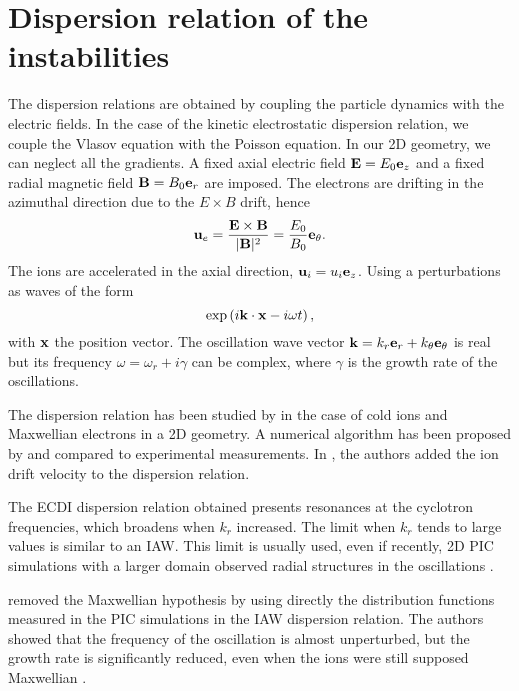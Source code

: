 
\section{Dispersion relation of the instabilities}
  \label{sec-DR-kinetic}
  
  
  The dispersion relations are obtained by coupling the particle dynamics with the electric fields.
  In the case of the kinetic electrostatic dispersion relation, we couple the Vlasov equation with the Poisson equation.
  In our \ac{2D} geometry, we can neglect all the gradients.
  A fixed axial electric field ${\mathbf E} = E_0 {\mathbf e_z}$ and a fixed radial magnetic field ${\mathbf B} = B_0 {\mathbf e_r}$ are imposed.
  The electrons are drifting in the azimuthal direction due to the $E\times B$ drift, hence
  \[ {\mathbf u_{e}} = \frac{{\mathbf E} \times {\mathbf B}}{\lvert{\mathbf B}\rvert^2} = \frac{E_0}{B_0}  {\mathbf e_{\theta}}.    \]
  The ions are accelerated in the axial direction, $ {\mathbf u_i} = u_i  {\mathbf e_z}$.
  Using a perturbations as waves of the form \[ \exp \left( i {\mathbf k} \cdot {\mathbf x} - i \omega t  \right), \]
  with ${\mathbf x}$ the position vector.
  The oscillation wave vector ${\mathbf k} = k_r {\mathbf e_r} + k_{\theta} {\mathbf e_{\theta}}$ is real but its frequency $\omega = \omega_r + i \gamma$ can be complex, where $\gamma$ is the growth rate of the oscillations. 
  
  \vspace{1em}
  The dispersion relation has been studied by \citet{ducrocq2006} in the case of cold ions and Maxwellian electrons in a \ac{2D} geometry.
  A numerical algorithm has been proposed by \citet{cavalier2013} and compared to experimental measurements.
  In \citet{lafleur2016}, the authors added the ion drift velocity to the dispersion relation.
  
  The \ac{ECDI} dispersion relation obtained presents resonances at the cyclotron frequencies, which broadens when $k_r$ increased.
  The limit when $k_r$ tends to large values is similar to an \ac{IAW}.
  This limit is usually used, even if recently, \ac{2D} \ac{PIC} simulations with a larger domain observed radial structures in the oscillations \citep{janhunen2018,hara2019a}.
  
  \citet{lafleur2018} removed the Maxwellian hypothesis by using directly the distribution functions measured in the \ac{PIC} simulations in the \ac{IAW} dispersion relation.
  The authors showed that the frequency of the oscillation is almost unperturbed, but the growth rate is significantly reduced, even when the ions were still supposed Maxwellian \citep[Fig. 8]{lafleur2018}.
  
